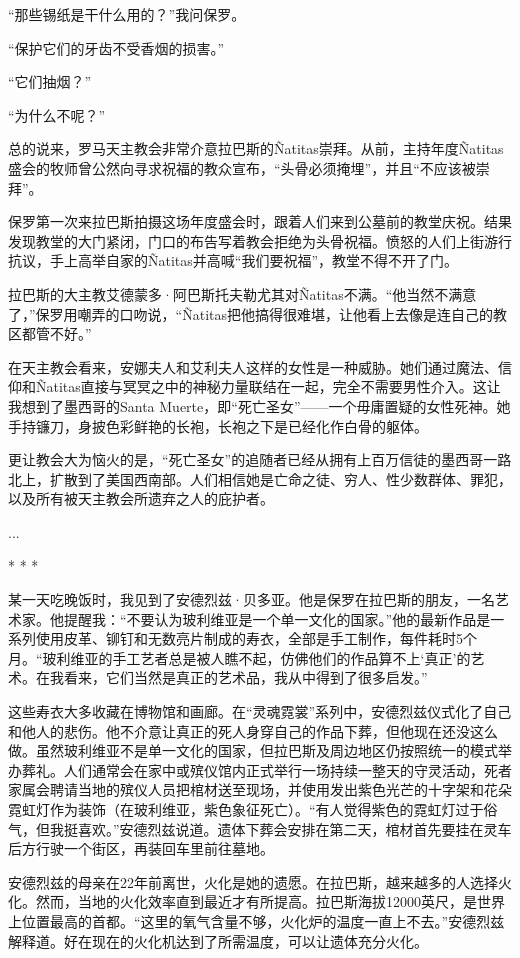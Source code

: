 \documentclass[12pt,oneside]{book}
\begin{document}
\begin{bookref}[frametitle={\cite{好好告别：世界葬礼观察手记}}]
“那些锡纸是干什么用的？”我问保罗。

“保护它们的牙齿不受香烟的损害。”

“它们抽烟？”

“为什么不呢？”

总的说来，罗马天主教会非常介意拉巴斯的Ñatitas崇拜。从前，主持年度Ñatitas盛会的牧师曾公然向寻求祝福的教众宣布，“头骨必须掩埋”，并且“不应该被崇拜”。

保罗第一次来拉巴斯拍摄这场年度盛会时，跟着人们来到公墓前的教堂庆祝。结果发现教堂的大门紧闭，门口的布告写着教会拒绝为头骨祝福。愤怒的人们上街游行抗议，手上高举自家的Ñatitas并高喊“我们要祝福”，教堂不得不开了门。

拉巴斯的大主教艾德蒙多·阿巴斯托夫勒尤其对Ñatitas不满。“他当然不满意了，”保罗用嘲弄的口吻说，“Ñatitas把他搞得很难堪，让他看上去像是连自己的教区都管不好。”

在天主教会看来，安娜夫人和艾利夫人这样的女性是一种威胁。她们通过魔法、信仰和Ñatitas直接与冥冥之中的神秘力量联结在一起，完全不需要男性介入。这让我想到了墨西哥的Santa Muerte，即“死亡圣女”——一个毋庸置疑的女性死神。她手持镰刀，身披色彩鲜艳的长袍，长袍之下是已经化作白骨的躯体。

更让教会大为恼火的是，“死亡圣女”的追随者已经从拥有上百万信徒的墨西哥一路北上，扩散到了美国西南部。人们相信她是亡命之徒、穷人、性少数群体、罪犯，以及所有被天主教会所遗弃之人的庇护者。

...

\begin{center}
* * *
\end{center}

某一天吃晚饭时，我见到了安德烈兹·贝多亚。他是保罗在拉巴斯的朋友，一名艺术家。他提醒我：“不要认为玻利维亚是一个单一文化的国家。”他的最新作品是一系列使用皮革、铆钉和无数亮片制成的寿衣，全部是手工制作，每件耗时5个月。“玻利维亚的手工艺者总是被人瞧不起，仿佛他们的作品算不上‘真正’的艺术。在我看来，它们当然是真正的艺术品，我从中得到了很多启发。”

这些寿衣大多收藏在博物馆和画廊。在“灵魂霓裳”系列中，安德烈兹仪式化了自己和他人的悲伤。他不介意让真正的死人身穿自己的作品下葬，但他现在还没这么做。虽然玻利维亚不是单一文化的国家，但拉巴斯及周边地区仍按照统一的模式举办葬礼。人们通常会在家中或殡仪馆内正式举行一场持续一整天的守灵活动，死者家属会聘请当地的殡仪人员把棺材送至现场，并使用发出紫色光芒的十字架和花朵霓虹灯作为装饰（在玻利维亚，紫色象征死亡）。“有人觉得紫色的霓虹灯过于俗气，但我挺喜欢。”安德烈兹说道。遗体下葬会安排在第二天，棺材首先要挂在灵车后方行驶一个街区，再装回车里前往墓地。

安德烈兹的母亲在22年前离世，火化是她的遗愿。在拉巴斯，越来越多的人选择火化。然而，当地的火化效率直到最近才有所提高。拉巴斯海拔12000英尺，是世界上位置最高的首都。“这里的氧气含量不够，火化炉的温度一直上不去。”安德烈兹解释道。好在现在的火化机达到了所需温度，可以让遗体充分火化。


\end{bookref}
\end{document}
